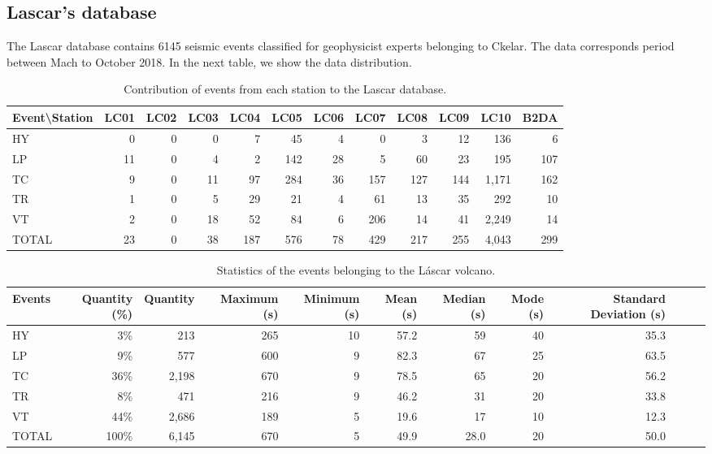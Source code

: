 \documentclass[journal]{IEEEtran}
\begin{document}
\subsection{Lascar's database}
The Lascar database contains 6145 seismic events classified for geophysicist experts belonging to Ckelar. The data corresponds period between Mach to October 2018. In the next table, we show the data distribution.
\begin{table}
\caption{Contribution of events from each station to the Lascar database.} %
\centering
\begin{adjustbox}{width=\textwidth}
\begin{tabular}{lrrrrrrrrrrr}
\hline\hline %
Event\textbackslash{}Station & LC01 & LC02 & LC03 & LC04 & LC05 & LC06 & LC07 & LC08 & LC09 & LC10 & B2DA \\
\hline %
HY & 0 & 0 & 0 & 7 & 45 & 4 & 0 & 3 & 12 & 136 & 6 \\
LP & 11 & 0 & 4 & 2 & 142 & 28 & 5 & 60 & 23 & 195 & 107 \\
TC & 9 & 0 & 11 & 97 & 284 & 36 & 157 & 127 & 144 & 1,171 & 162 \\
TR & 1 & 0 & 5 & 29 & 21 & 4 & 61 & 13 & 35 & 292 & 10 \\
VT & 2 & 0 & 18 & 52 & 84 & 6 & 206 & 14 & 41 & 2,249 & 14 \\
TOTAL & 23 & 0 & 38 & 187 & 576 & 78 & 429 & 217 & 255 & 4,043 & 299 \\
\hline %
\end{tabular}
\end{adjustbox}
\end{table}

\begin{table}
\caption{Statistics of the events belonging to the Láscar volcano.} %
\centering
\begin{tabular}{lrrrrrrrrrrr}
\hline\hline %
  Events & Quantity (\%) & Quantity & Maximum (s) & Minimum (s) & Mean (s) & Median (s) & Mode (s) & Standard Deviation (s)  \\
\hline %
HY & 3\% & 213 & 265 & 10 & 57.2 & 59 & 40 & 35.3 \\
LP & 9\% & 577 & 600 & 9 & 82.3 & 67 & 25 & 63.5 \\
TC & 36\% & 2,198 & 670 & 9 & 78.5 & 65 & 20 & 56.2 \\
TR & 8\% & 471 & 216 & 9 & 46.2 & 31 & 20 & 33.8 \\
VT & 44\% & 2,686 & 189 & 5 & 19.6 & 17 & 10 & 12.3 \\
TOTAL & 100\% & 6,145 & 670 & 5 & 49.9 & 28.0 & 20 & 50.0 \\
\hline %
\end{tabular}
\end{table}
\end{document}
